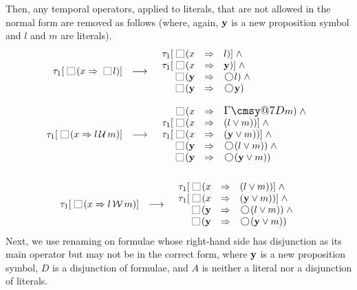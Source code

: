 \documentclass[nohyperref]{acmtrans2f}
\makeatletter
\def\sometime{\mathord{\hbox{\large$\mathchar"0\cmsy@7D$}}}
\newcommand{\always}{\raisebox{-.2ex}{
                           \mbox{\unitlength=0.9ex
                           \begin{picture}(2,2)
                           \linethickness{0.06ex}
                           \put(0,0){\line(1,0){2}}
                           \put(0,2){\line(1,0){2}}
                           \put(0,0){\line(0,1){2}}
                           \put(2,0){\line(0,1){2}}
                           \end{picture}}}
                          \,}
\newcommand{\next}{\!\raisebox{-.2ex}{ %
                        \mbox{\unitlength=0.9ex
                        \begin{picture}(2,2)
                        \linethickness{0.06ex}
                        \put(1,1){\circle{2}} %
                        \end{picture}}}       %
                        \,}
\def\until{\hbox{$\,\cal U \,$}}
\def\unless{\hbox{$\,\cal W \,$}}
\let\imp=\Rightarrow
\makeatother
\begin{document}
Then, any temporal operators, applied to literals, that are not allowed
in the normal form are removed as follows (where, again, ${\bf y}$ is a new
proposition symbol and $l$ and $m$ are literals).
$$
\begin{array}{rcll}
\tau_1[\always(x \imp  \always l )]
 & \longrightarrow  &
\begin{array}{rcl} 
\tau_1[\always(x & \imp & l)] \; \land  \\
\tau_1[\always(x & \imp & {\bf y})] \; \land \\
\always({\bf y} & \imp & \next l) \; \land \\
\always({\bf y} & \imp & \next {\bf y}) 
\end{array} \\
\\
\tau_1[\always(x \imp  l \until m)]
 & \longrightarrow  &
\begin{array}{rcl} 
\always(x & \imp  & \sometime m ) \; \land \\
\tau_1[\always(x & \imp & (l \lor m))] \; \land \\
\tau_1[\always(x & \imp & ({\bf y} \lor m))]\; \land \\
\always({\bf y} & \imp & \next(l \lor m)) \; \land \\
\always({\bf y} & \imp & \next ({\bf y} \lor m)) 
\end{array}  \\
\end{array}
$$
$$
\begin{array}{rcll}
%
\\
\tau_1[\always(x \imp  l \unless m)]
 & \longrightarrow  &
\begin{array}{rcl} 
\tau_1[\always(x & \imp & (l \lor m))]\; \land \\
\tau_1[\always(x & \imp & ({\bf y} \lor m))]\; \land \\
\always({\bf y} & \imp & \next(l \lor m)) \; \land \\
\always({\bf y} & \imp & \next ({\bf y} \lor m)) 
\end{array} \\
\end{array}
$$
Next, we use renaming on formulae whose right-hand side has
disjunction as its main operator but may not be in the correct form,
where ${\bf y}$ is a new proposition symbol, $D$ is a disjunction of
formulae, and $A$ is neither a literal nor a disjunction of literals.
\end{document}
